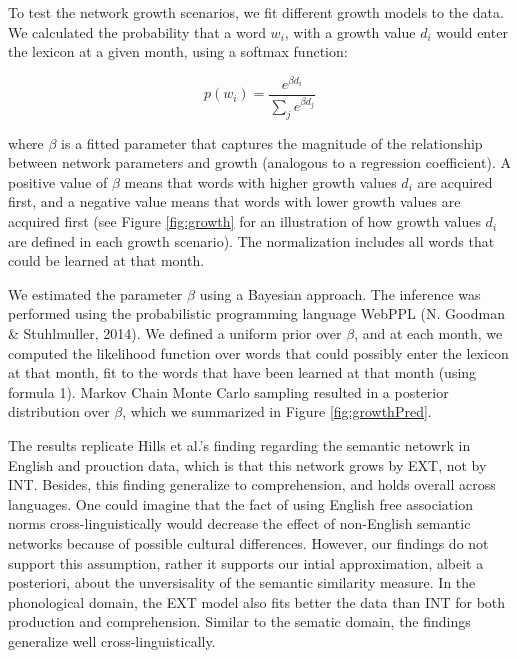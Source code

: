 \documentclass[english,floatsintext,man]{apa6}
\theoremstyle{definition}
\theoremstyle{definition}
\theoremstyle{definition}
\theoremstyle{remark}
\begin{document}
To test the network growth scenarios, we fit different growth models to
the data. We calculated the probability that a word \(w_i\), with a
growth value \(d_i\) would enter the lexicon at a given month, using a
softmax function:

\begin{equation}
 p(w_i)= \frac{e^{\beta d_i}}{\sum_j e^{\beta d_j} }
\end{equation}

\noindent where \(\beta\) is a fitted parameter that captures the
magnitude of the relationship between network parameters and growth
(analogous to a regression coefficient). A positive value of \(\beta\)
means that words with higher growth values \(d_i\) are acquired first,
and a negative value means that words with lower growth values are
acquired first (see Figure \ref{fig:growth} for an illustration of how
growth values \(d_i\) are defined in each growth scenario). The
normalization includes all words that could be learned at that month.

We estimated the parameter \(\beta\) using a Bayesian approach. The
inference was performed using the probabilistic programming language
WebPPL (N. Goodman \& Stuhlmuller, 2014). We defined a uniform prior
over \(\beta\), and at each month, we computed the likelihood function
over words that could possibly enter the lexicon at that month, fit to
the words that have been learned at that month (using formula 1). Markov
Chain Monte Carlo sampling resulted in a posterior distribution over
\(\beta\), which we summarized in Figure \ref{fig:growthPred}.

The results replicate Hills et al.'s finding regarding the semantic
netowrk in English and prouction data, which is that this network grows
by EXT, not by INT. Besides, this finding generalize to comprehension,
and holds overall across languages. One could imagine that the fact of
using English free association norms cross-linguistically would decrease
the effect of non-English semantic networks because of possible cultural
differences. However, our findings do not support this assumption,
rather it supports our intial approximation, albeit a posteriori, about
the unversisality of the semantic similarity measure. In the
phonological domain, the EXT model also fits better the data than INT
for both production and comprehension. Similar to the sematic domain,
the findings generalize well cross-linguistically.
\end{document}
